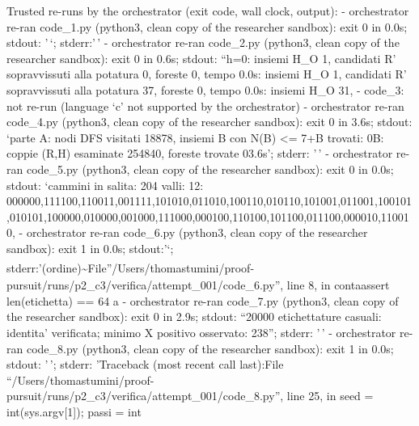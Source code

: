 Trusted re-runs by the orchestrator (exit code, wall clock, output): -
orchestrator re-ran code\_1.py (python3, clean copy of the researcher
sandbox): exit 0 in 0.0s; stdout: '\,`; stderr:'\,' - orchestrator
re-ran code\_2.py (python3, clean copy of the researcher sandbox): exit
0 in 0.6s; stdout: ``h=0: insiemi H\_O 1, candidati R' sopravvissuti
alla potatura 0, foreste 0, tempo 0.0s: insiemi H\_O 1, candidati
R' sopravvissuti alla potatura 37, foreste 0, tempo 0.0s: insiemi
H\_O 31, - code\_3: not re-run (language `c' not supported by the
orchestrator) - orchestrator re-ran code\_4.py (python3, clean copy of
the researcher sandbox): exit 0 in 3.6s; stdout: `parte A: nodi DFS
visitati 18878, insiemi B con \textbar N(B)\textbar{} \textless=
7+\textbar B\textbar{} trovati: 0\nparte B: coppie (R,H) esaminate
254840, foreste trovate 0\ntempo 3.6s'; stderr: '\,' - orchestrator
re-ran code\_5.py (python3, clean copy of the researcher sandbox): exit
0 in 0.0s; stdout: `cammini in salita: 204 valli: 12\nordine:
000000,111100,110011,001111,101010,011010,100110,010110,101001,011001,100101,010101,100000,010000,001000,111000,000100,110100,101100,011100,000010,110010,
- orchestrator re-ran code\_6.py (python3, clean copy of the researcher
sandbox): exit 1 in 0.0s; stdout:'`;
stderr:'(ordine)\n                      \textsubscript{}\textasciitilde{}\textsuperscript{}\n  File''/Users/thomastumini/proof-pursuit/runs/p2\_c3/verifica/attempt\_001/code\_6.py'',
line 8, in conta\n    assert len(etichetta) == 64 a - orchestrator
re-ran code\_7.py (python3, clean copy of the researcher sandbox): exit
0 in 2.9s; stdout: ``20000 etichettature casuali: identita' verificata;
minimo X positivo osservato: 238''; stderr: '\,' - orchestrator re-ran
code\_8.py (python3, clean copy of the researcher sandbox): exit 1 in
0.0s; stdout: '\,'; stderr: 'Traceback (most recent call last):\n  File
``/Users/thomastumini/proof-pursuit/runs/p2\_c3/verifica/attempt\_001/code\_8.py'',
line 25, in \n    seed = int(sys.argv{[}1{]}); passi = int


